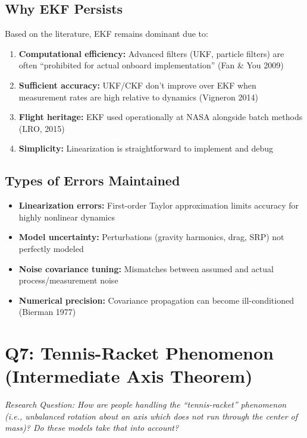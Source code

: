 \documentclass[11pt]{article}
\begin{document}
\subsection{Why EKF Persists}

Based on the literature, EKF remains dominant due to:
\begin{enumerate}
    \item \textbf{Computational efficiency:} Advanced filters (UKF, particle filters) are often ``prohibited for actual onboard implementation'' (Fan \& You 2009)
    \item \textbf{Sufficient accuracy:} UKF/CKF don't improve over EKF when measurement rates are high relative to dynamics (Vigneron 2014)
    \item \textbf{Flight heritage:} EKF used operationally at NASA alongside batch methods (LRO, 2015)
    \item \textbf{Simplicity:} Linearization is straightforward to implement and debug
\end{enumerate}

\subsection{Types of Errors Maintained}

\begin{itemize}
    \item \textbf{Linearization errors:} First-order Taylor approximation limits accuracy for highly nonlinear dynamics
    \item \textbf{Model uncertainty:} Perturbations (gravity harmonics, drag, SRP) not perfectly modeled
    \item \textbf{Noise covariance tuning:} Mismatches between assumed and actual process/measurement noise
    \item \textbf{Numerical precision:} Covariance propagation can become ill-conditioned (Bierman 1977)
\end{itemize}

\section{Q7: Tennis-Racket Phenomenon (Intermediate Axis Theorem)}
\label{sec:tennis}

\textit{Research Question: How are people handling the ``tennis-racket'' phenomenon (i.e., unbalanced rotation about an axis which does not run through the center of mass)? Do these models take that into account?}
\end{document}

